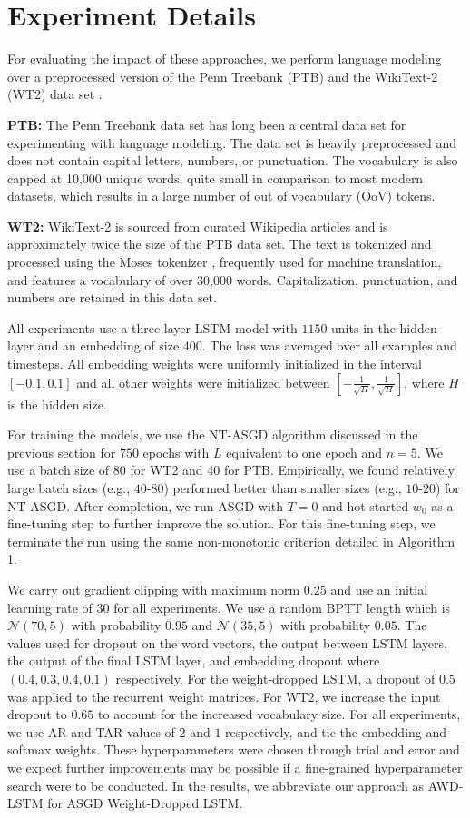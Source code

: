 \documentclass{article}
\begin{document}
\section{Experiment Details}

For evaluating the impact of these approaches, we perform language modeling over a preprocessed version of the Penn Treebank (PTB) \citep{Mikolov2010} and the WikiText-2 (WT2) data set \citep{Merity2016}.

\textbf{PTB:} The Penn Treebank data set has long been a central data set for experimenting with language modeling.
The data set is heavily preprocessed and does not contain capital letters, numbers, or punctuation.
The vocabulary is also capped at 10,000 unique words, quite small in comparison to most modern datasets, which results in a large number of out of vocabulary (OoV) tokens. 

\textbf{WT2:} WikiText-2 is sourced from curated Wikipedia articles and is approximately twice the size of the PTB data set.
The text is tokenized and processed using the Moses tokenizer \citep{Koehn2007MosesOS}, frequently used for machine translation, and features a vocabulary of over 30,000 words.
Capitalization, punctuation, and numbers are retained in this data set.

All experiments use a three-layer LSTM model with $1150$ units in the hidden layer and
an embedding of size $400$. The loss was averaged over all examples and timesteps.
All embedding weights were uniformly initialized in the interval $[-0.1, 0.1]$ and all other weights were initialized between $[-\frac{1}{\sqrt{H}}, \frac{1}{\sqrt{H}}]$, where $H$ is the hidden size.

For training the models, we use the NT-ASGD algorithm discussed in the previous section for $750$ epochs with $L$ equivalent to one epoch and $n=5$. We use a batch size of $80$ for WT2 and $40$ for PTB. Empirically, we found relatively large batch sizes (e.g., $40$-$80$) performed better than smaller sizes (e.g., $10$-$20$) for NT-ASGD. After completion, we run ASGD with $T=0$ and hot-started $w_0$ as a fine-tuning step to further improve the solution. For this fine-tuning step, we terminate the run using the same non-monotonic criterion detailed in Algorithm 1.

We carry out gradient clipping with maximum norm $0.25$ and use an initial learning rate of $30$ for all experiments.
We use a random BPTT length which is $\mathcal{N}(70, 5)$ with probability $0.95$ and $\mathcal{N}(35, 5)$ with probability $0.05$.
The values used for dropout on the word vectors, the output between LSTM layers, the output of the final LSTM layer, and embedding dropout where $(0.4, 0.3, 0.4, 0.1)$ respectively.
For the weight-dropped LSTM, a dropout of $0.5$ was applied to the recurrent weight matrices.
For WT2, we increase the input dropout to $0.65$ to account for the increased vocabulary size.
For all experiments, we use AR and TAR values of $2$ and $1$ respectively, and tie the embedding and softmax weights.
These hyperparameters were chosen through trial and error and we expect further improvements may be possible if a fine-grained hyperparameter search were to be conducted.
In the results, we abbreviate our approach as AWD-LSTM for ASGD Weight-Dropped LSTM.
\end{document}
